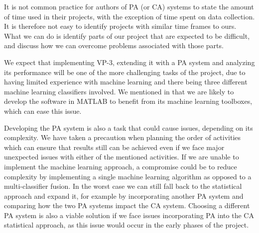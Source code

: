 \documentclass[informationsecurity]{gucmasterproject}
\begin{document}
It is not common practice for authors of PA (or CA) systems to state the amount of time used in their projects, with the exception of time spent on data collection.
It is therefore not easy to identify projects with similar time frames to ours.
What we can do is identify parts of our project that are expected to be difficult, and discuss how we can overcome problems associated with those parts.

We expect that implementing VP-3, extending it with a PA system and analyzing its performance will be one of the more challenging tasks of the project, due to having limited experience with machine learning and there being three different machine learning classifiers involved.
We mentioned in  that we are likely to develop the software in MATLAB to benefit from its machine learning toolboxes, which can ease this issue.

Developing the PA system is also a task that could cause issues, depending on its complexity.
We have taken a precaution when planning the order of activities which can ensure that results still can be achieved even if we face major unexpected issues with either of the mentioned activities.
If we are unable to implement the machine learning approach, a compromise could be to reduce complexity by implementing a single machine learning algorithm as opposed to a multi-classifier fusion. 
In the worst case we can still fall back to the statistical approach and expand it, for example by incorporating another PA system and comparing how the two PA systems impact the CA system.
Choosing a different PA system is also a viable solution if we face issues incorporating PA into the CA statistical approach, as this issue would occur in the early phases of the project.




%

\end{document}
